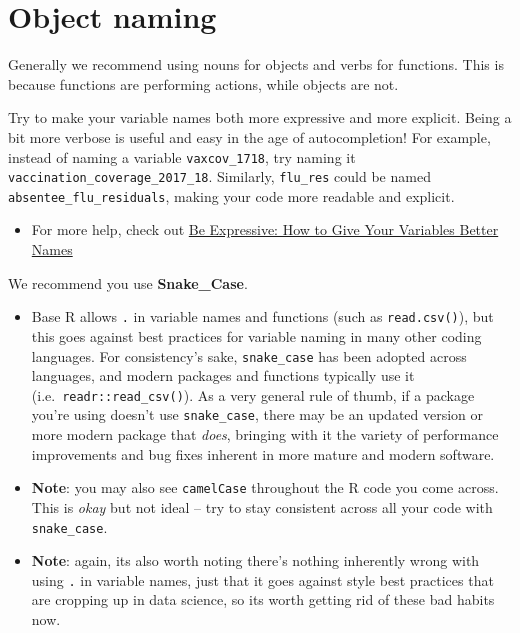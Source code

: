 \documentclass[
]{book}
\providecommand{\tightlist}{%
  \setlength{\itemsep}{0pt}\setlength{\parskip}{0pt}}
\begin{document}
\section{Object naming}\label{object-naming}

Generally we recommend using nouns for objects and verbs for functions. This is because functions are performing actions, while objects are not.

Try to make your variable names both more expressive and more explicit. Being a bit more verbose is useful and easy in the age of autocompletion! For example, instead of naming a variable \texttt{vaxcov\_1718}, try naming it \texttt{vaccination\_coverage\_2017\_18}. Similarly, \texttt{flu\_res} could be named \texttt{absentee\_flu\_residuals}, making your code more readable and explicit.

\begin{itemize}
\tightlist
\item
  For more help, check out \href{https://spin.atomicobject.com/2017/11/01/good-variable-names/}{Be Expressive: How to Give Your Variables Better Names}
\end{itemize}

We recommend you use \textbf{Snake\_Case}.

\begin{itemize}
\item
  Base R allows \texttt{.} in variable names and functions (such as \texttt{read.csv()}), but this goes against best practices for variable naming in many other coding languages. For consistency's sake, \texttt{snake\_case} has been adopted across languages, and modern packages and functions typically use it (i.e.~\texttt{readr::read\_csv()}). As a very general rule of thumb, if a package you're using doesn't use \texttt{snake\_case}, there may be an updated version or more modern package that \emph{does}, bringing with it the variety of performance improvements and bug fixes inherent in more mature and modern software.
\item
  \textbf{Note}: you may also see \texttt{camelCase} throughout the R code you come across. This is \emph{okay} but not ideal -- try to stay consistent across all your code with \texttt{snake\_case}.
\item
  \textbf{Note}: again, its also worth noting there's nothing inherently wrong with using \texttt{.} in variable names, just that it goes against style best practices that are cropping up in data science, so its worth getting rid of these bad habits now.
\end{itemize}
\end{document}
